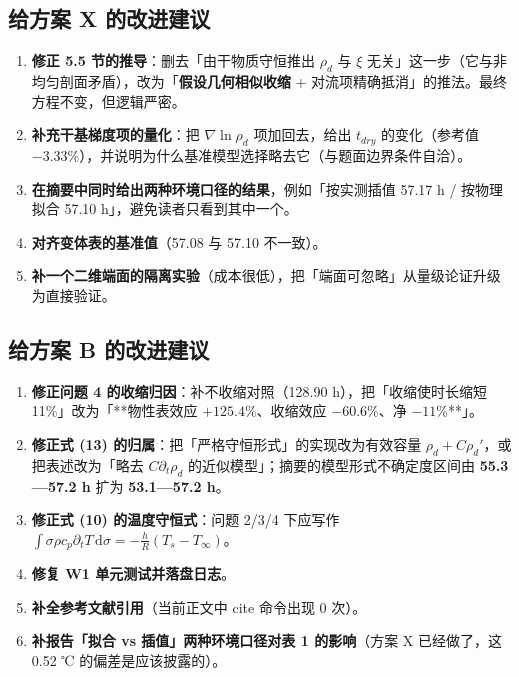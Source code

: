 \subsection{给方案 X 的改进建议}


\begin{enumerate}
\item \textbf{修正 5.5 节的推导}：删去「由干物质守恒推出 $\rho_d$ 与 $\xi$ 无关」这一步（它与非均匀剖面矛盾），改为「\textbf{假设几何相似收缩} + 对流项精确抵消」的推法。最终方程不变，但逻辑严密。
\item \textbf{补充干基梯度项的量化}：把 $\nabla\ln\rho_d$ 项加回去，给出 $t_{dry}$ 的变化（参考值 $-3.33\%$），并说明为什么基准模型选择略去它（与题面边界条件自洽）。
\item \textbf{在摘要中同时给出两种环境口径的结果}，例如「按实测插值 57.17 h / 按物理拟合 57.10 h」，避免读者只看到其中一个。
\item \textbf{对齐变体表的基准值}（57.08 与 57.10 不一致）。
\item \textbf{补一个二维端面的隔离实验}（成本很低），把「端面可忽略」从量级论证升级为直接验证。
\end{enumerate}


\subsection{给方案 B 的改进建议}


\begin{enumerate}
\item \textbf{修正问题 4 的收缩归因}：补不收缩对照（128.90 h），把「收缩使时长缩短 11\%」改为「**物性表效应 $+125.4\%$、收缩效应 $-60.6\%$、净 $-11\%$**」。
\item \textbf{修正式 (13) 的归属}：把「严格守恒形式」的实现改为有效容量 $\rho_d+C\rho_d'$，或把表述改为「略去 $C\partial_t\rho_d$ 的近似模型」；摘要的模型形式不确定度区间由 \textbf{55.3—57.2 h} 扩为 \textbf{53.1—57.2 h}。
\item \textbf{修正式 (10) 的温度守恒式}：问题 2/3/4 下应写作 $\int\sigma\rho c_p\partial_tT\,\mathrm d\sigma=-\frac hR(T_s-T_\infty)$。
\item \textbf{修复 W1 单元测试并落盘日志}。
\item \textbf{补全参考文献引用}（当前正文中 cite 命令出现 0 次）。
\item \textbf{补报告「拟合 vs 插值」两种环境口径对表 1 的影响}（方案 X 已经做了，这 0.52 ℃ 的偏差是应该披露的）。
\end{enumerate}


